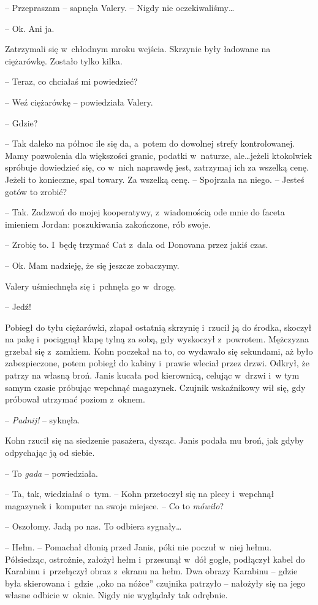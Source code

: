\documentclass[oneside,polish,11pt,sfheadings]{mwbk}
\begin{document}
-- Przepraszam -- sapnęła Valery. -- Nigdy nie oczekiwaliśmy\ldots

-- Ok. Ani ja.

Zatrzymali się w~chłodnym mroku wejścia. Skrzynie były ładowane na
ciężarówkę. Zostało tylko kilka.

-- Teraz, co chciałaś mi powiedzieć?

-- Weź ciężarówkę -- powiedziała Valery.

-- Gdzie?

-- Tak daleko na północ ile się da, a~potem do dowolnej strefy
kontrolowanej. Mamy pozwolenia dla większości granic, podatki w~naturze,
ale\ldots jeżeli ktokolwiek spróbuje dowiedzieć się, co w~nich naprawdę
jest, zatrzymaj ich za wszelką cenę. Jeżeli to konieczne, spal towary.
Za wszelką cenę. -- Spojrzała na niego. -- Jesteś gotów to zrobić?

-- Tak. Zadzwoń do mojej kooperatywy, z~wiadomością ode mnie do faceta
imieniem Jordan: poszukiwania zakończone, rób swoje.

-- Zrobię to. I~będę trzymać Cat z~dala od Donovana przez jakiś czas.

-- Ok. Mam nadzieję, że się jeszcze zobaczymy.

Valery uśmiechnęła się i~pchnęła go w~drogę. 

-- Jedź!

Pobiegł do tyłu ciężarówki, złapał ostatnią skrzynię i~rzucił ją do
środka, skoczył na pakę i~pociągnął klapę tylną za sobą, gdy wyskoczył z~powrotem. Mężczyzna grzebał się z~zamkiem. Kohn poczekał na to, co
wydawało się sekundami, aż było zabezpieczone, potem pobiegł do kabiny i~prawie wleciał przez drzwi. Odkrył, że patrzy na własną broń. Janis
kucała pod kierownicą, celując w~drzwi i~w tym samym czasie próbując
wepchnąć magazynek. Czujnik wskaźnikowy wił się, gdy próbował utrzymać
poziom z~oknem.

-- \emph{Padnij!} -- syknęła.

Kohn rzucił się na siedzenie pasażera, dysząc. Janis podała mu broń, jak
gdyby odpychając ją od siebie.

-- To \emph{gada} -- powiedziała.

-- Ta, tak, wiedziałaś o~tym. -- Kohn przetoczył się na plecy i~wepchnął
magazynek i~komputer na swoje miejsce. -- Co to \emph{mówiło}?

-- Oszołomy. Jadą po nas. To odbiera sygnały\ldots

-- Hełm. -- Pomachał dłonią przed Janis, póki nie poczuł w~niej hełmu.
Półsiedząc, ostrożnie, założył hełm i~przesunął w~dół gogle, podłączył
kabel do Karabinu i~przełączył obraz z~ekranu na hełm. Dwa obrazy
Karabinu -- gdzie była skierowana i~gdzie ,,oko na nóżce'' czujnika
patrzyło -- nałożyły się na jego własne odbicie w~oknie. Nigdy nie
wyglądały tak odrębnie.
\end{document}
